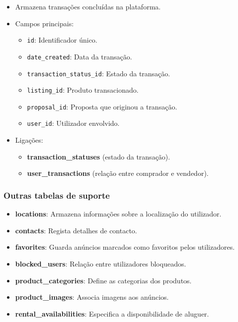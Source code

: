 \documentclass[a4paper, 12pt]{article} %
\begin{document}
\begin{itemize}
	\item Armazena transações concluídas na plataforma.
	\item Campos principais:
	\begin{itemize}
		\item \verb|id|: Identificador único.
		\item \verb|date_created|: Data da transação.
		\item \verb|transaction_status_id|: Estado da transação.
		\item \verb|listing_id|: Produto transacionado.
		\item \verb|proposal_id|: Proposta que originou a transação.
		\item \verb|user_id|: Utilizador envolvido.
	\end{itemize}
	\item Ligações:
	\begin{itemize}
		\item \textbf{transaction\_statuses} (estado da transação).
		\item \textbf{user\_transactions} (relação entre comprador e vendedor).
	\end{itemize}
\end{itemize}

\subsubsection{\textbf{Outras tabelas de suporte}}

\begin{itemize}
	\item \textbf{locations}: Armazena informações sobre a localização do utilizador.
	\item \textbf{contacts}: Regista detalhes de contacto.
	\item \textbf{favorites}: Guarda anúncios marcados como favoritos pelos utilizadores.
	\item \textbf{blocked\_users}: Relação entre utilizadores bloqueados.
	\item \textbf{product\_categories}: Define as categorias dos produtos.
	\item \textbf{product\_images}: Associa imagens aos anúncios.
	\item \textbf{rental\_availabilities}: Especifica a disponibilidade de aluguer.
\end{itemize}
\end{document}
